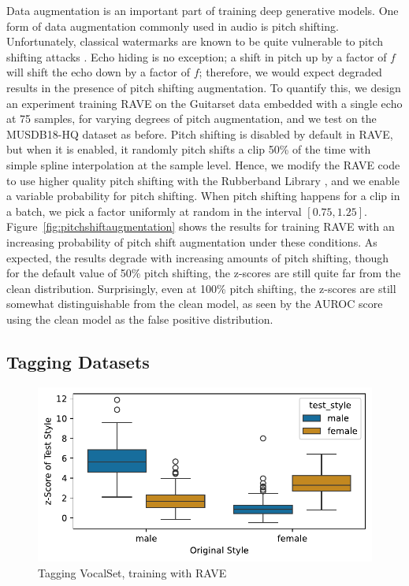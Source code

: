 \documentclass[letterpaper]{article} %
\begin{document}
Data augmentation is an important part of training deep generative models.  One form of data augmentation commonly used in audio is pitch shifting.  Unfortunately, classical watermarks are known to be quite vulnerable to pitch shifting attacks \cite{hu2014variable}.  Echo hiding is no exception; a shift in pitch up by a factor of $f$ will shift the echo down by a factor of $f$; therefore, we would expect degraded results in the presence of pitch shifting augmentation.  To quantify this, we design an experiment training RAVE on the Guitarset data embedded with a single echo at 75 samples, for varying degrees of pitch augmentation, and we test on the MUSDB18-HQ dataset as before.  Pitch shifting is disabled by default in RAVE, but when it is enabled, it randomly pitch shifts a clip 50\% of the time with simple spline interpolation at the sample level.  Hence, we modify the RAVE code to use higher quality pitch shifting with the Rubberband Library \cite{cannam2024pyrubberband}, and we enable a variable probability for pitch shifting.  When pitch shifting happens for a clip in a batch, we pick a factor uniformly at random in the interval $[0.75, 1.25]$.  Figure~\ref{fig:pitchshiftaugmentation} shows the results for training RAVE with an increasing probability of pitch shift augmentation under these conditions.  As expected, the results degrade with increasing amounts of pitch shifting, though for the default value of 50\% pitch shifting, the z-scores are still quite far from the clean distribution.  Surprisingly, even at 100\% pitch shifting, the z-scores are still somewhat distinguishable from the clean model, as seen by the AUROC score using the clean model as the false positive distribution.

\subsection{Tagging Datasets}

\begin{figure}
    \centering
    \includegraphics[width=\columnwidth]{figs/Rave_Tagging_MaleFemale.pdf}
    \caption{Tagging VocalSet, training with RAVE}
    \label{fig:vocalsettagging}
\end{figure}
\end{document}
